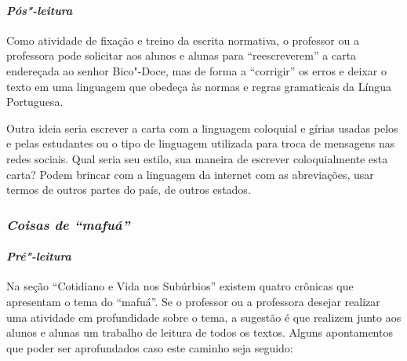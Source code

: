 \documentclass[11pt]{extarticle}
\begin{document}
\paragraph{\textit{Pós"-leitura}}

Como atividade de fixação e treino da escrita normativa, o professor ou
a professora pode solicitar aos alunos e alunas para ``reescreverem'' a
carta endereçada ao senhor Bico"-Doce, mas de forma a ``corrigir'' os
erros e deixar o texto em uma linguagem que obedeça às normas e regras
gramaticais da Língua Portuguesa.

Outra ideia seria escrever a carta com a linguagem coloquial e gírias
usadas pelos e pelas estudantes ou o tipo de linguagem utilizada para
troca de mensagens nas redes sociais. Qual seria seu estilo, sua maneira
de escrever coloquialmente esta carta? Podem brincar com a linguagem da
internet com as abreviações, usar termos de outros partes do país, de
outros estados.

\subsubsection{\textit{Coisas de ``mafuá''}}

\paragraph{\textit{Pré"-leitura}}

Na seção ``Cotidiano e Vida nos Subúrbios'' existem quatro crônicas que
apresentam o tema do ``mafuá''. Se o professor ou a professora desejar
realizar uma atividade em profundidade sobre o tema, a sugestão é que
realizem junto aos alunos e alunas um trabalho de leitura de todos os
textos. Alguns apontamentos que poder ser aprofundados caso este caminho
seja seguido:
\end{document}
